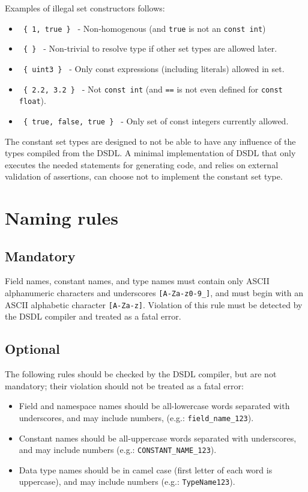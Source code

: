 Examples of illegal set constructors follows:
\begin{itemize}
    \item \texttt{ \{ 1, true \} } - Non-homogenous (and \verb|true| is not an \verb|const int|)
    \item \texttt{ \{ \} } - Non-trivial to resolve type if other set types are allowed later.
    \item \texttt{ \{ uint3 \} } - Only const expressions (including literals) allowed in set.
    \item \texttt{ \{ 2.2, 3.2 \} } - Not \verb|const int| (and \verb|==| is not even defined for \verb|const float|).
    \item \texttt{ \{ true, false, true \} } - Only set of const integers currently allowed.
\end{itemize}

The constant set types are designed to not be able to have any influence of the types compiled from the DSDL.
A minimal implementation of DSDL that only executes the needed statements for generating code,
and relies on external validation of assertions, can choose not to implement the constant set type.

\section{Naming rules}\label{sec:dsdl_naming_rules}

\subsection{Mandatory}

Field names, constant names, and type names must contain only ASCII alphanumeric characters and underscores
\verb|[A-Za-z0-9_]|,
and must begin with an ASCII alphabetic character \verb|[A-Za-z]|.
Violation of this rule must be detected by the DSDL compiler and treated as a fatal error.

\subsection{Optional}

The following rules should be checked by the DSDL compiler, but are not mandatory;
their violation should not be treated as a fatal error:

\begin{itemize}
    \item Field and namespace names should be all-lowercase words separated with underscores,
          and may include numbers, (e.g.: \verb|field_name_123|).

    \item Constant names should be all-uppercase words separated with underscores,
          and may include numbers (e.g.: \verb|CONSTANT_NAME_123|).

    \item Data type names should be in camel case (first letter of each word is uppercase),
          and may include numbers (e.g.: \verb|TypeName123|).
\end{itemize}

